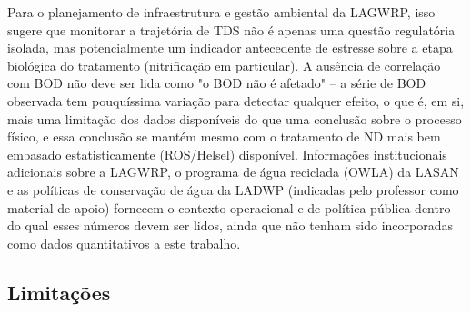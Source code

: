 Para o planejamento de infraestrutura e gestão ambiental da LAGWRP, isso sugere que monitorar a trajetória de TDS não é apenas uma questão regulatória isolada, mas potencialmente um indicador antecedente de estresse sobre a etapa biológica do tratamento (nitrificação em particular). A ausência de correlação com BOD não deve ser lida como "o BOD não é afetado" -- a série de BOD observada tem pouquíssima variação para detectar qualquer efeito, o que é, em si, mais uma limitação dos dados disponíveis do que uma conclusão sobre o processo físico, e essa conclusão se mantém mesmo com o tratamento de ND mais bem embasado estatisticamente (ROS/Helsel) disponível. Informações institucionais adicionais sobre a LAGWRP, o programa de água reciclada (OWLA) da LASAN e as políticas de conservação de água da LADWP (indicadas pelo professor como material de apoio) fornecem o contexto operacional e de política pública dentro do qual esses números devem ser lidos, ainda que não tenham sido incorporadas como dados quantitativos a este trabalho.

\subsection{Limitações}

